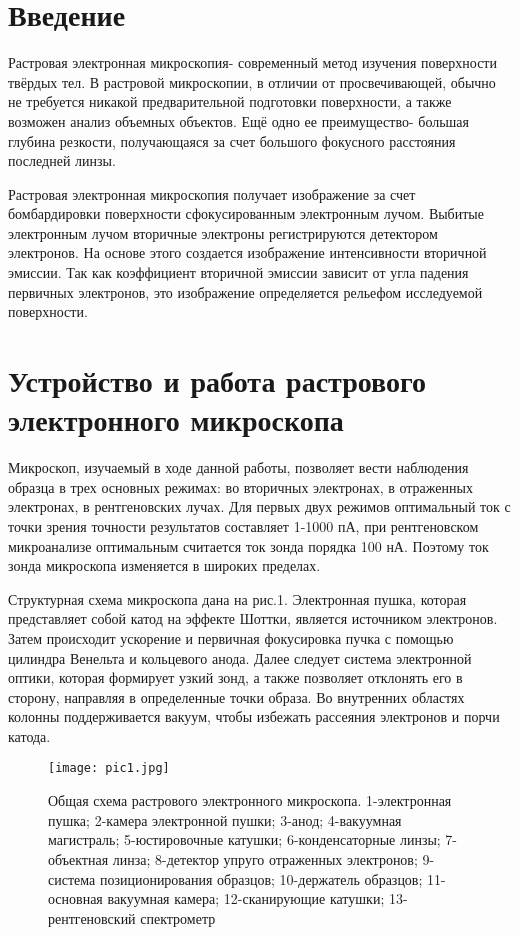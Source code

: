 \documentclass[a4paper,12pt]{article}
\theoremstyle{plain} %
\theoremstyle{definition} %
\theoremstyle{remark} %
\begin{document}
	\newpage
	\section{Введение}
	Растровая электронная микроскопия- современный метод изучения поверхности твёрдых тел. В растровой микроскопии, в отличии от просвечивающей, обычно не требуется никакой предварительной подготовки поверхности, а также возможен анализ объемных объектов. Ещё одно ее преимущество- большая глубина резкости, получающаяся за счет большого фокусного расстояния последней линзы.
	
	Растровая электронная микроскопия получает изображение за счет бомбардировки поверхности сфокусированным электронным лучом. Выбитые электронным лучом вторичные электроны регистрируются детектором электронов. На основе этого создается изображение интенсивности вторичной эмиссии. Так как коэффициент вторичной эмиссии зависит от угла падения первичных электронов, это изображение определяется рельефом исследуемой поверхности.
	\section{Устройство и работа растрового электронного микроскопа}
	Микроскоп, изучаемый в ходе данной работы, позволяет вести наблюдения образца в трех основных режимах: во вторичных электронах, в отраженных электронах, в рентгеновских лучах. Для первых двух режимов оптимальный ток с точки зрения точности результатов составляет 1-1000 пА, при рентгеновском микроанализе оптимальным считается ток зонда порядка 100 нА. Поэтому ток зонда микроскопа изменяется в широких пределах.
	
	Структурная схема микроскопа дана на рис.1. Электронная пушка, которая представляет собой катод на эффекте Шоттки, является источником электронов. Затем происходит ускорение и первичная фокусировка пучка с помощью цилиндра Венельта и кольцевого анода. Далее следует система электронной оптики, которая формирует узкий зонд, а также позволяет отклонять его в сторону, направляя в определенные точки образа. Во внутренних областях колонны поддерживается вакуум, чтобы избежать рассеяния электронов и порчи катода.
	\begin{figure}[H]
		\centering
		\texttt{[image: pic1.jpg]}
		\caption{Общая схема растрового электронного микроскопа. 1-электронная пушка; 2-камера электронной пушки; 3-анод; 4-вакуумная магистраль; 5-юстировочные катушки; 6-конденсаторные линзы; 7-объектная линза; 8-детектор упруго отраженных электронов; 9-система позиционирования образцов; 10-держатель образцов; 11-основная вакуумная камера; 12-сканирующие катушки; 13-рентгеновский спектрометр}
		\label{pic1}
	\end{figure}
\end{document}
